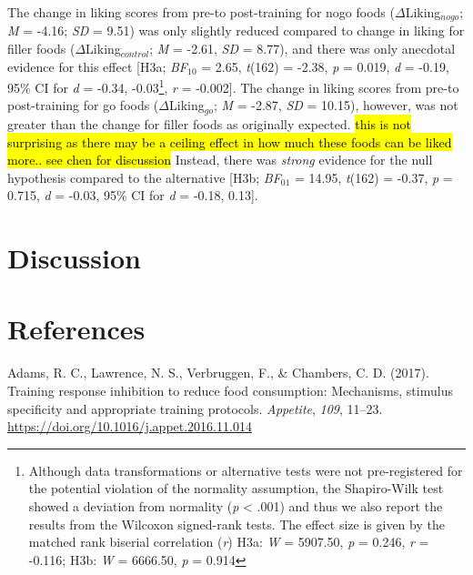 \documentclass[man,floatsintext]{apa6}
\let\rmarkdownfootnote\footnote%
\def\footnote{\protect\rmarkdownfootnote}
\begin{document}
The change in liking scores from pre-to post-training for nogo foods
(\(\Delta\)Liking\(_{nogo}\); \emph{M} = -4.16; \emph{SD} = 9.51) was
only slightly reduced compared to change in liking for filler foods
(\(\Delta\)Liking\(_{control}\); \emph{M} = -2.61, \emph{SD} = 8.77),
and there was only anecdotal evidence for this effect {[}H3a;
\emph{BF}\(_{10}\) = 2.65, \emph{t}(162) = -2.38, \emph{p} = 0.019,
\emph{d} = -0.19, 95\% CI for \emph{d} = -0.34,
-0.03\footnote{Although data transformations or alternative tests were not pre-registered for the potential violation of the normality assumption, the Shapiro-Wilk test showed a deviation from normality (\textit{p} < .001) and thus we also report the results from the Wilcoxon signed-rank tests. The effect size is given by the matched rank biserial correlation (\textit{r}) H3a: \textit{W} = 5907.50, \textit{p} = 0.246, \textit{r} = -0.116; H3b: \textit{W} = 6666.50, \textit{p} = 0.914},
\textit{r} = -0.002{]}. The change in liking scores from pre-to
post-training for go foods (\(\Delta\)Liking\(_{go}\); \emph{M} = -2.87,
\emph{SD} = 10.15), however, was not greater than the change for filler
foods as originally expected.
\hl{this is not surprising as there may be a ceiling effect in how much these foods can be liked more.. see chen for discussion}
Instead, there was \emph{strong} evidence for the null hypothesis
compared to the alternative {[}H3b; \emph{BF}\(_{01}\) = 14.95,
\emph{t}(162) = -0.37, \emph{p} = 0.715, \emph{d} = -0.03, 95\% CI for
\emph{d} = -0.18, 0.13{]}.

\section{Discussion}\label{discussion}

\newpage



\section{References}\label{references}

\begingroup
\setlength{\parindent}{-0.5in} \setlength{\leftskip}{0.5in}

\hypertarget{refs}{}
\hypertarget{ref-adams_training_2017}{}
Adams, R. C., Lawrence, N. S., Verbruggen, F., \& Chambers, C. D.
(2017). Training response inhibition to reduce food consumption:
Mechanisms, stimulus specificity and appropriate training protocols.
\emph{Appetite}, \emph{109}, 11--23.
\url{https://doi.org/10.1016/j.appet.2016.11.014}
\end{document}
